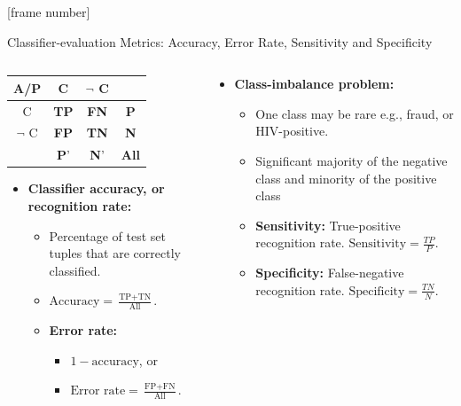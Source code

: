 \documentclass[aspectratio=169,t,table]{beamer}
\begin{document}
  {
    [frame number]
    \begin{frame}{Classifier-evaluation Metrics: Accuracy, Error Rate, Sensitivity and Specificity}
      \begin{columns}
        \begin{column}{0.5\textwidth}
          \centering
          \begin{tabular}{|c|c|c|c|}
            \hline
            A/P & C & $\neg$ C & \\\hline
            C & \textbf{TP} & \textbf{FN} & \textbf{P}\\\hline
            $\neg$ C & \textbf{FP} & \textbf{TN} & \textbf{N} \\\hline
            & \textbf{P}' & \textbf{N}' & \textbf{All}\\\hline
          \end{tabular}
          \begin{itemize}
            \item \textbf{Classifier accuracy, or recognition rate:}
            \begin{itemize}
              \item Percentage of test set tuples that are correctly classified.
              \item $\text{Accuracy} = \frac{\text{TP} + \text{TN}}{\text{All}}.$
              \item \textbf{Error rate:}
                \begin{itemize}
                  \item $1-\text{accuracy}$, or
                  \item $\text{Error rate} = \frac{\text{FP}+\text{FN}}{\text{All}}.$
                \end{itemize}
            \end{itemize}
          \end{itemize}
        \end{column}
        \begin{column}{0.5\textwidth}
          \begin{itemize}
            \item \textbf{Class-imbalance problem:}
            \begin{itemize}
              \item One class may be rare e.g., fraud, or HIV-positive.
              \item Significant majority of the negative class and minority of the positive class
              \item \textbf{Sensitivity:} True-positive recognition rate. $\text{Sensitivity} = \frac{TP}{P}$.
              \item \textbf{Specificity:} False-negative recognition rate. $\text{Specificity} = \frac{TN}{N}$.
            \end{itemize}
          \end{itemize}
        \end{column}
      \end{columns}
    \end{frame}
  }
\end{document}
